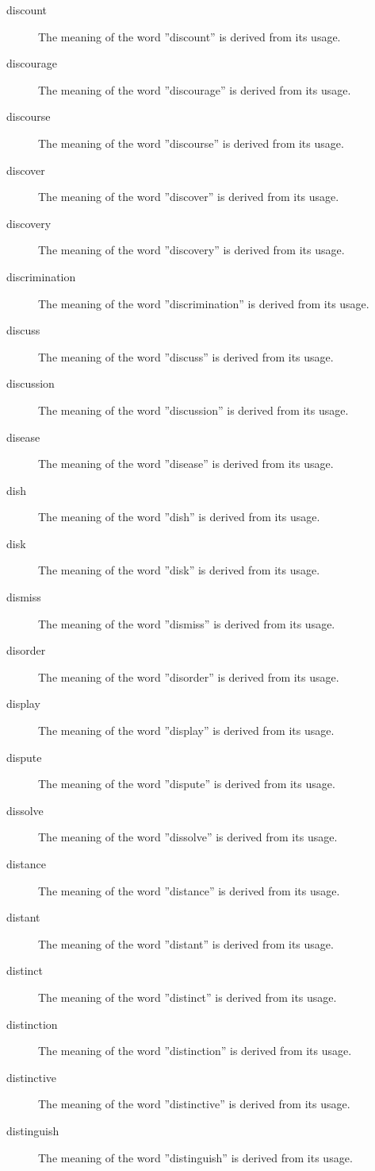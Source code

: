 \documentclass[12pt, letterpaper]{memoir}
\begin{document}
\begin{description}
\item[discount] The meaning of the word ''discount'' is derived from its usage.
\item[discourage] The meaning of the word ''discourage'' is derived from its usage.
\item[discourse] The meaning of the word ''discourse'' is derived from its usage.
\item[discover] The meaning of the word ''discover'' is derived from its usage.
\item[discovery] The meaning of the word ''discovery'' is derived from its usage.
\item[discrimination] The meaning of the word ''discrimination'' is derived from its usage.
\item[discuss] The meaning of the word ''discuss'' is derived from its usage.
\item[discussion] The meaning of the word ''discussion'' is derived from its usage.
\item[disease] The meaning of the word ''disease'' is derived from its usage.
\item[dish] The meaning of the word ''dish'' is derived from its usage.
\item[disk] The meaning of the word ''disk'' is derived from its usage.
\item[dismiss] The meaning of the word ''dismiss'' is derived from its usage.
\item[disorder] The meaning of the word ''disorder'' is derived from its usage.
\item[display] The meaning of the word ''display'' is derived from its usage.
\item[dispute] The meaning of the word ''dispute'' is derived from its usage.
\item[dissolve] The meaning of the word ''dissolve'' is derived from its usage.
\item[distance] The meaning of the word ''distance'' is derived from its usage.
\item[distant] The meaning of the word ''distant'' is derived from its usage.
\item[distinct] The meaning of the word ''distinct'' is derived from its usage.
\item[distinction] The meaning of the word ''distinction'' is derived from its usage.
\item[distinctive] The meaning of the word ''distinctive'' is derived from its usage.
\item[distinguish] The meaning of the word ''distinguish'' is derived from its usage.

\end{description}
\end{document}
